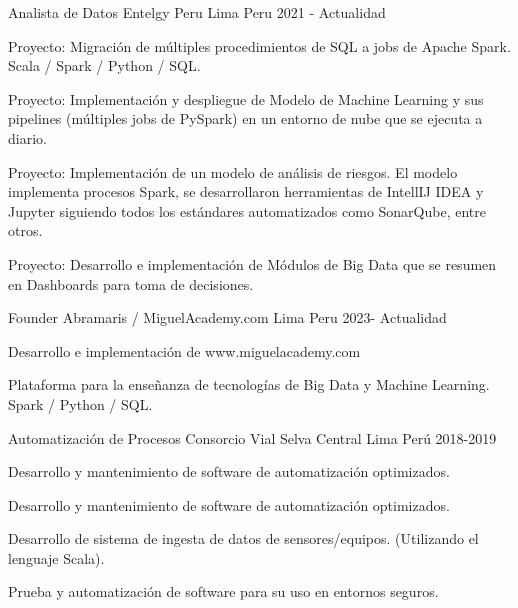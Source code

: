 

\begin{cventries}

  \cventry
    {Analista de Datos} %
    {Entelgy Peru} %
    {Lima Peru} %
    {2021 - Actualidad} %
    {
      \begin{cvitems} %
        \item {Proyecto: Migración de múltiples procedimientos de SQL a jobs de Apache Spark. Scala / Spark / Python / SQL.}
        \item {Proyecto: Implementación y despliegue de Modelo de Machine Learning y sus pipelines (múltiples jobs de PySpark) en un entorno de nube que se ejecuta a diario.}
        \item {Proyecto: Implementación de un modelo de análisis de riesgos. El modelo implementa procesos Spark, se desarrollaron herramientas de IntellIJ IDEA y Jupyter siguiendo todos los estándares automatizados como SonarQube, entre otros.}
        \item {Proyecto: Desarrollo e implementación de Módulos de Big Data que se resumen en Dashboards para toma de decisiones.}
      \end{cvitems}
    }

  \cventry
  {Founder} %
  {Abramaris / MiguelAcademy.com} %
  {Lima Peru} %
  {2023- Actualidad} %
  {
    \begin{cvitems} %
      \item {Desarrollo e implementación de www.miguelacademy.com}
      \item {Plataforma para la enseñanza de tecnologías de Big Data y Machine Learning. Spark / Python / SQL.}
    \end{cvitems}
  }
  \cventry
  {Automatización de Procesos} %
  {Consorcio Vial Selva Central} %
  {Lima Perú} %
  {2018-2019} %
  {
    \begin{cvitems} %
      \item {Desarrollo y mantenimiento de software de automatizaci\'on optimizados.}
      \item {Desarrollo y mantenimiento de software de automatización optimizados.}
      \item {Desarrollo de sistema de ingesta de datos de sensores/equipos. (Utilizando el lenguaje Scala).}
      \item {Prueba y automatización de software para su uso en entornos seguros.}


\end{cvitems}}
\end{cventries}
